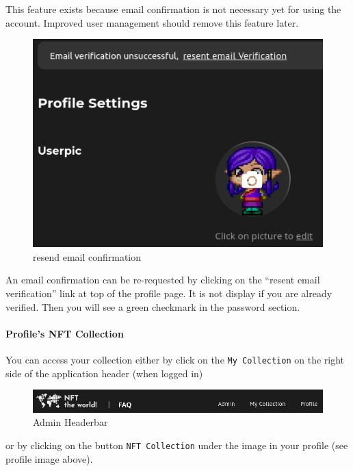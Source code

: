 \documentclass[
]{article}
\begin{document}
This feature exists because email confirmation is not necessary yet for
using the account. Improved user management should remove this feature
later.

\begin{figure}
\centering
\includegraphics{images/resend_email_confirm.png}
\caption{resend email confirmation}
\end{figure}\newpage

An email confirmation can be re-requested by clicking on the ``resent
email verification'' link at top of the profile page. It is not display
if you are already verified. Then you will see a green checkmark in the
password section.

\hypertarget{profiles-nft-collection}{%
\paragraph{Profile's NFT Collection}\label{profiles-nft-collection}}

You can access your collection either by click on the
\texttt{My\ Collection} on the right side of the application header
(when logged in)

\begin{figure}
\centering
\includegraphics{images/admin_header.png}
\caption{Admin Headerbar}
\end{figure}

or by clicking on the button \texttt{NFT\ Collection} under the image in
your profile (see profile image above).
\end{document}
